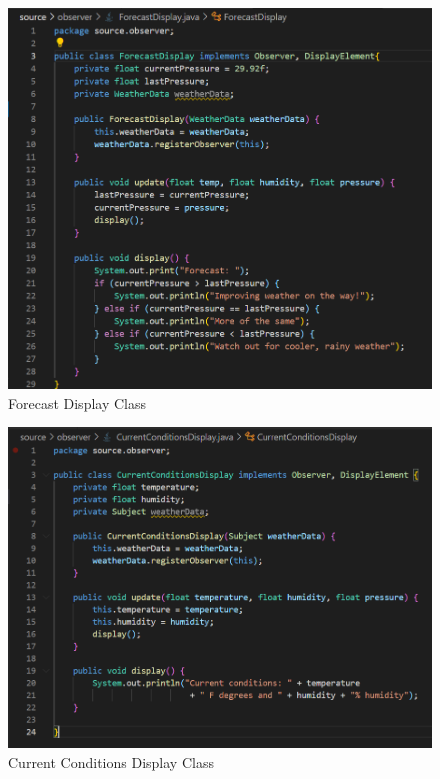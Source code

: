 \newpage
\begin{figure}[!htb]
    \centering
    \includegraphics[width=\textwidth]{fig/Observer/forecast_display_class.png}
    \caption{Forecast Display Class}
    \label{fig:forecast_display_class}
\end{figure}
\newpage
\begin{figure}[!htb]
    \centering
    \includegraphics[width=\textwidth]{fig/Observer/current_conditions_display_class.png}
    \caption{Current Conditions Display Class}
    \label{fig:current_conditions_display_class}
\end{figure}
